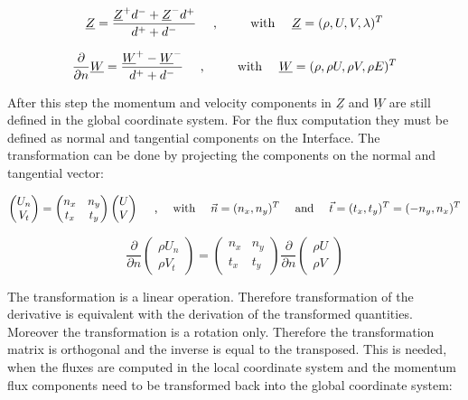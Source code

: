 \documentclass[
	pdftex,             %
	12pt,				%
	a4paper,		   	%
	english,				%
	oneside,			%
]{article}
\newcommand{\uu}[1]{\underline{#1}}
\newcommand{\vv}[1]{\vec{#1}}
\begin{document}
\begin{equation}
\uu{Z} = \dfrac{\uu{Z}^+ d^- + \uu{Z}^- d^+}{d^+ + d^-}
\textnormal{~~~~,~~~~~~~~with~~~~}
\uu{Z} = (\rho, U, V, \lambda)^T
\end{equation}

\begin{equation}
\dfrac{\partial}{\partial n} \uu{W} = \dfrac{\uu{W}^+ -\uu{W}^- }{d^+ + d^-}
\textnormal{~~~~,~~~~~~~~with~~~~}
\uu{W} = (\rho, \rho U, \rho V, \rho E)^T
\end{equation}

After this step the momentum and velocity components in $\uu{Z}$ and $\uu{W}$ are still defined in the global coordinate system. For the flux computation they must be defined as normal and tangential components on the Interface. The transformation can be done by projecting the components on the normal and tangential vector:

\begin{equation}
\begin{pmatrix} U_n \\ V_t \end{pmatrix}
=
\begin{pmatrix} n_x & n_y \\ t_x & t_y \end{pmatrix}
\begin{pmatrix} U \\ V \end{pmatrix}
\textnormal{~~~~,~~~~with~~~~}
\vv{n} = (n_x, n_y)^T
\textnormal{~~~~and~~~~}
\vv{t} = (t_x, t_y)^T = (-n_y, n_x)^T
\end{equation}

\begin{equation}
\dfrac{\partial}{\partial n}
\begin{pmatrix} \rho U_n \\ \rho V_t \end{pmatrix}
=
\begin{pmatrix} n_x & n_y \\ t_x & t_y \end{pmatrix}
\dfrac{\partial}{\partial n}
\begin{pmatrix} \rho U \\ \rho V \end{pmatrix}
\end{equation}

The transformation is a linear operation. Therefore transformation of the derivative is equivalent with the derivation of the transformed quantities. Moreover the transformation is a rotation only. Therefore the transformation matrix is orthogonal and the inverse is equal to the transposed. This is needed, when the fluxes are computed in the local coordinate system and the momentum flux components need to be transformed back into the global coordinate system:
\end{document}
